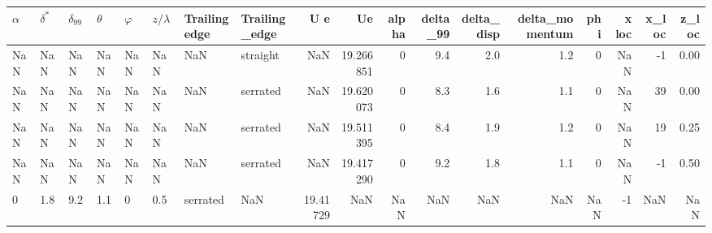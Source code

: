 \begin{tabular}{llllllllrrrrrrrrrr}
\toprule
$\alpha$ & $\delta^*$ & $\delta_{99}$ & $\theta$ & $\varphi$ & $z/\lambda$ & Trailing edge & Trailing_edge &       U e &         Ue &  alpha &  delta_99 &  delta_disp &  delta_momentum &  phi &  x loc &  x_loc &  z_loc \\
\midrule
     NaN &        NaN &           NaN &      NaN &       NaN &         NaN &           NaN &      straight &       NaN &  19.266851 &      0 &       9.4 &         2.0 &             1.2 &    0 &    NaN &     -1 &   0.00 \\
     NaN &        NaN &           NaN &      NaN &       NaN &         NaN &           NaN &      serrated &       NaN &  19.620073 &      0 &       8.3 &         1.6 &             1.1 &    0 &    NaN &     39 &   0.00 \\
     NaN &        NaN &           NaN &      NaN &       NaN &         NaN &           NaN &      serrated &       NaN &  19.511395 &      0 &       8.4 &         1.9 &             1.2 &    0 &    NaN &     19 &   0.25 \\
     NaN &        NaN &           NaN &      NaN &       NaN &         NaN &           NaN &      serrated &       NaN &  19.417290 &      0 &       9.2 &         1.8 &             1.1 &    0 &    NaN &     -1 &   0.50 \\
       0 &        1.8 &           9.2 &      1.1 &         0 &         0.5 &      serrated &           NaN &  19.41729 &        NaN &    NaN &       NaN &         NaN &             NaN &  NaN &     -1 &    NaN &    NaN \\
\bottomrule
\end{tabular}
